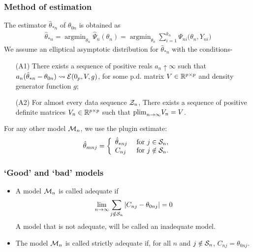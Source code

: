 \documentclass[10pt]{beamer}
\theoremstyle{definition}
\DeclareMathOperator*{\argmin}{argmin}
\begin{document}
\begin{frame}
\frametitle{Method of estimation}
The estimator $\hat{\theta}_{* n}$ of $\theta_{0 n}$ is obtained as
%
\begin{align*}
\hat{\theta}_{* n} = 
\argmin_{\theta_n} \hat{\Psi}_{n} (\theta_n) =
\argmin_{\theta_n} \sum_{i = 1}^{k_{n}} \Psi_{n i}  \bigl( \theta_n, Y_{ni} \bigr)
\end{align*}
%
We assume an elliptical asymptotic distribution for $\hat \theta_{* n}$ with the conditions-

\begin{enumerate}
\item[(A1)]
There exists a sequence of positive reals $a_n \uparrow \infty$ such that $a_{n} (\hat \theta_{* n} - \theta_{0 n} ) \leadsto {\cal{E}} ( 0_p, V, g)$, for some p.d. matrix $V \in {\mathbb{R}}^{p \times p}$ and density generator function $g$;

\item[(A2)]
For almost every data sequence ${\cal{Z}}_n$, There exists a sequence of positive definite matrices $V_n \in {\mathbb{R}}^{p \times p}$ such that  $\text{plim}_{n \rightarrow \infty} V_n = V$.
\end{enumerate}
 
For any other model ${\cal{M}}_n$, we use the plugin estimate:
%
\begin{align*}
 \hat{\theta}_{m n j} = \left\{ \begin{array}{ll}
 \hat{\theta}_{ * n j} & \text{ for } j \in {\cal{S}}_n, \\
 C_{n j} & \text{ for } j \notin {\cal{S}}_n.
\end{array}
\right.
\end{align*}
\end{frame}


\begin{frame}
\frametitle{`Good' and `bad' models}

\begin{itemize}
\item A model ${\cal{M}}_{n}$ is called {\colbit adequate} if
%
\begin{align*}
\lim_{n \rightarrow \infty}
\sum_{j \notin {\cal{S}}_n} | C_{n j}  - {\theta}_{0 nj} | = 0
\end{align*}
%
A model that is not adequate, will be called an {\colbit inadequate} model.

\item The model ${\cal{M}}_{n}$ is called {\colbit strictly adequate} if, for all $n$ and $j \notin {\cal{S}}_n$, $C_{n j}  = {\theta}_{0 n j}$.
\end{itemize}
%
\vspace{1em}

\end{frame}
\end{document}
